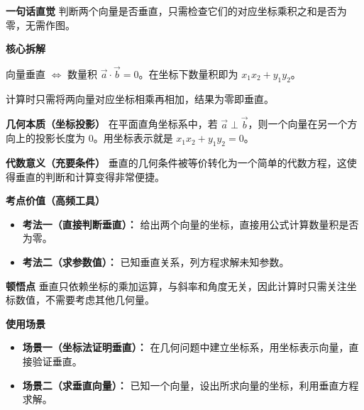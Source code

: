\begin{explanationbox}
	\textbf{\textcolor{CExplanation}{一句话直觉}}
	判断两个向量是否垂直，只需检查它们的对应坐标乘积之和是否为零，无需作图。

	\medskip
	\textbf{\textcolor{CExplanation}{核心拆解}}
	\begin{description}[style=nextline, leftmargin=2.8em, labelsep=0.5em, itemsep=0.45em]
		\item[\textbf{要点一（数量积为零）：}]
			向量垂直 $\Leftrightarrow$ 数量积 $\vec{a}\cdot\vec{b}=0$。在坐标下数量积即为 $x_1x_2+y_1y_2$。
		\item[\textbf{要点二（坐标运算规则）：}]
			计算时只需将两向量对应坐标相乘再相加，结果为零即垂直。
	\end{description}

	\medskip
	\textbf{\textcolor{CExplanation}{几何本质（坐标投影）}}
	在平面直角坐标系中，若 $\vec{a}\perp\vec{b}$，则一个向量在另一个方向上的投影长度为 $0$。用坐标表示就是 $x_1x_2+y_1y_2=0$。

	\medskip
	\textbf{\textcolor{CExplanation}{代数意义（充要条件）}}
	垂直的几何条件被等价转化为一个简单的代数方程，这使得垂直的判断和计算变得非常便捷。

	\medskip
	\textbf{\textcolor{CExplanation}{考点价值（高频工具）}}
	\begin{itemize}[leftmargin=*, itemsep=0.5em, topsep=0.4em]
		\item \textbf{考法一（直接判断垂直）：} 给出两个向量的坐标，直接用公式计算数量积是否为零。
		\item \textbf{考法二（求参数值）：} 已知垂直关系，列方程求解未知参数。
	\end{itemize}

	\medskip
	\textbf{\textcolor{CExplanation}{顿悟点}}
	垂直只依赖坐标的乘加运算，与斜率和角度无关，因此计算时只需关注坐标数值，不需要考虑其他几何量。

	\medskip
	\textbf{\textcolor{CExplanation}{使用场景}}
	\begin{itemize}[leftmargin=*, itemsep=0.5em, topsep=0.4em]
		\item \textbf{场景一（坐标法证明垂直）：} 在几何问题中建立坐标系，用坐标表示向量，直接验证垂直。
		\item \textbf{场景二（求垂直向量）：} 已知一个向量，设出所求向量的坐标，利用垂直方程求解。
	\end{itemize}

\end{explanationbox}

